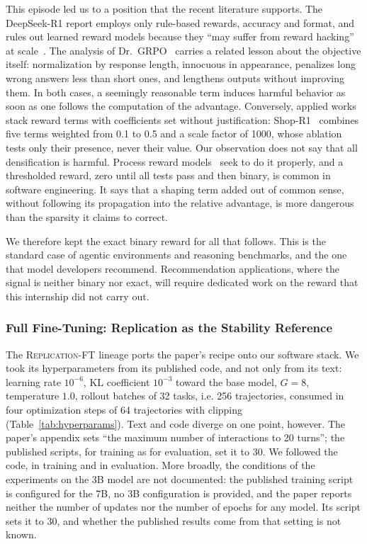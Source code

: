 \documentclass[11pt,a4paper]{article}
\begin{document}
This episode led us to a position that the recent literature supports. The DeepSeek-R1 report employs only rule-based rewards, accuracy and format, and rules out learned reward models because they ``may suffer from reward hacking'' at scale~\cite{deepseekr1_2025}. The analysis of Dr.~GRPO~\cite{liu2025drgrpo} carries a related lesson about the objective itself: normalization by response length, innocuous in appearance, penalizes long wrong answers less than short ones, and lengthens outputs without improving them. In both cases, a seemingly reasonable term induces harmful behavior as soon as one follows the computation of the advantage. Conversely, applied works stack reward terms with coefficients set without justification: Shop-R1~\cite{shopr1_2026} combines five terms weighted from 0.1 to 0.5 and a scale factor of 1000, whose ablation tests only their presence, never their value. Our observation does not say that all densification is harmful. Process reward models~\cite{lightman2023verify} seek to do it properly, and a thresholded reward, zero until all tests pass and then binary, is common in software engineering. It says that a shaping term added out of common sense, without following its propagation into the relative advantage, is more dangerous than the sparsity it claims to correct.

We therefore kept the exact binary reward for all that follows. This is the standard case of agentic environments and reasoning benchmarks, and the one that model developers recommend. Recommendation applications, where the signal is neither binary nor exact, will require dedicated work on the reward that this internship did not carry out.






\subsubsection{Full Fine-Tuning: Replication as the Stability Reference}

The \textsc{Replication-FT} lineage ports the paper's recipe onto our software stack. We took its hyperparameters from its published code, and not only from its text: learning rate $10^{-6}$, KL coefficient $10^{-3}$ toward the base model, $G=8$, temperature $1.0$, rollout batches of 32 tasks, i.e. 256 trajectories, consumed in four optimization steps of 64 trajectories with clipping (Table~\ref{tab:hyperparams}). Text and code diverge on one point, however. The paper's appendix sets ``the maximum number of interactions to 20 turns''; the published scripts, for training as for evaluation, set it to 30. We followed the code, in training and in evaluation. More broadly, the conditions of the experiments on the 3B model are not documented: the published training script is configured for the 7B, no 3B configuration is provided, and the paper reports neither the number of updates nor the number of epochs for any model. Its script sets it to 30, and whether the published results come from that setting is not known.
\end{document}
